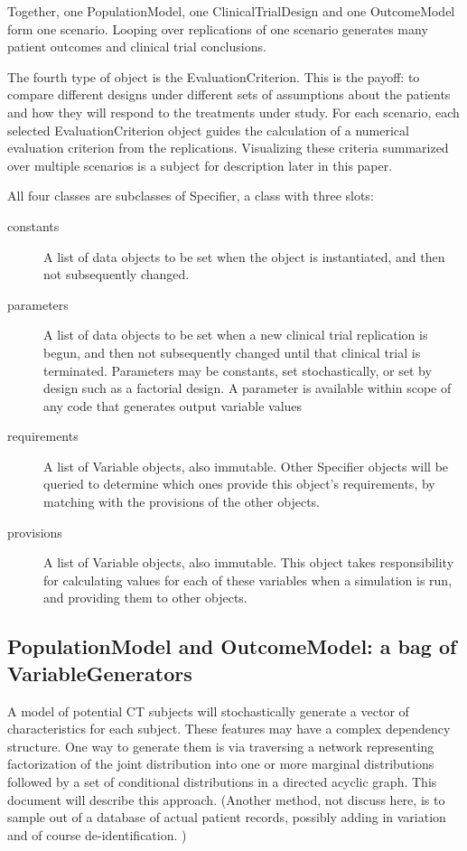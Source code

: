 \documentclass[12pt]{amsart}
\begin{document}
Together, one PopulationModel,
one ClinicalTrialDesign and one OutcomeModel
 form one scenario.
Looping over replications of one scenario  
 generates many patient outcomes and clinical trial conclusions.
 
The fourth type of object is the EvaluationCriterion.
This is the payoff: to compare different designs under
different sets of assumptions about the patients and
how they will respond to the treatments under study.
For each scenario, each selected  EvaluationCriterion object
guides the calculation of a numerical evaluation criterion
from the replications.
Visualizing these criteria summarized over 
multiple scenarios is a subject for description later in this paper.



All four classes are subclasses of Specifier, a class with three slots:
\begin{description}
\item[constants] A list of data objects to be set when the object is instantiated, 
and then not subsequently changed. 
\item[ parameters] A list of data objects to be set when a new clinical trial replication is begun, 
and then not subsequently changed until that clinical trial is terminated. Parameters may
be constants, set stochastically, or set by design such as a factorial design. 
A parameter is  available within scope of any code that generates output variable values  
\item[ requirements] A list of Variable objects, also immutable. Other Specifier objects  will be queried to determine which ones provide this object's requirements, by matching with the provisions of the other  objects. 
\item[ provisions] A list of Variable objects, also immutable. This object takes responsibility for calculating values for each of these variables when a simulation is run, and providing them to other objects. 
\end{description}


\subsection{PopulationModel and OutcomeModel: a bag of VariableGenerators}


A model of potential CT subjects will stochastically generate a
vector of characteristics for each subject.
These features may have a complex dependency structure.
One way to generate them is via traversing a network 
representing factorization of the joint distribution into
one or more marginal distributions followed by  a set
of conditional distributions in a directed acyclic graph.
This document will describe this approach. 
(Another method, not discuss here, is to sample out of a database of actual patient records,
 possibly adding in variation and of course de-identification. )
\end{document}
